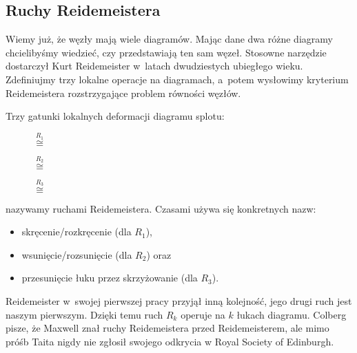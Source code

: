 
\subsection{Ruchy Reidemeistera}

Wiemy już, że węzły mają wiele diagramów.
Mając dane dwa różne diagramy chcielibyśmy wiedzieć, czy przedstawiają ten sam węzeł.
Stosowne narzędzie dostarczył Kurt Reidemeister w~latach dwudziestych ubiegłego wieku.
%
Zdefiniujmy trzy lokalne operacje na diagramach, a~potem wysłowimy kryterium  Reidemeistera rozstrzygające problem równości węzłów.

\begin{definition}
%
    Trzy gatunki lokalnych deformacji diagramu splotu:
    \begin{figure}[H]
    \centering
    \begin{minipage}[b]{.22\linewidth}%
        \centering%
        \MedLarReidemeisterOneLeft $\stackrel{R_1}{\cong}$ \MedLarReidemeisterOneStraight%
    \end{minipage}
    \quad\quad\quad
    \begin{minipage}[b]{.2\linewidth}
        \centering
        \MedLarReidemeisterTwoA $\stackrel{R_2}{\cong}$ \MedLarReidemeisterTwoB
    \end{minipage}
    \quad\quad\quad
    \begin{minipage}[b]{.32\linewidth}
        \centering
        \MedLarReidemeisterThreeA $\stackrel{R_3}{\cong}$ \MedLarReidemeisterThreeB
    \end{minipage}
    \end{figure}
    nazywamy ruchami Reidemeistera.
    Czasami używa się konkretnych nazw:
    \begin{itemize}
        \item skręcenie/rozkręcenie (dla $R_1$),
        \item wsunięcie/rozsunięcie (dla $R_2$) oraz
        \item przesunięcie łuku przez skrzyżowanie (dla $R_3$).
    \end{itemize}
\end{definition}

Reidemeister w~swojej pierwszej pracy przyjął inną kolejność, jego drugi ruch jest naszym pierwszym.
Dzięki temu ruch $R_k$ operuje na $k$ łukach diagramu.
Colberg \cite[s. 6]{colberg2013} pisze, że Maxwell znał ruchy Reidemeistera przed Reidemeisterem, ale mimo próśb Taita nigdy nie zgłosił swojego odkrycia w Royal Society of Edinburgh.
%
%

